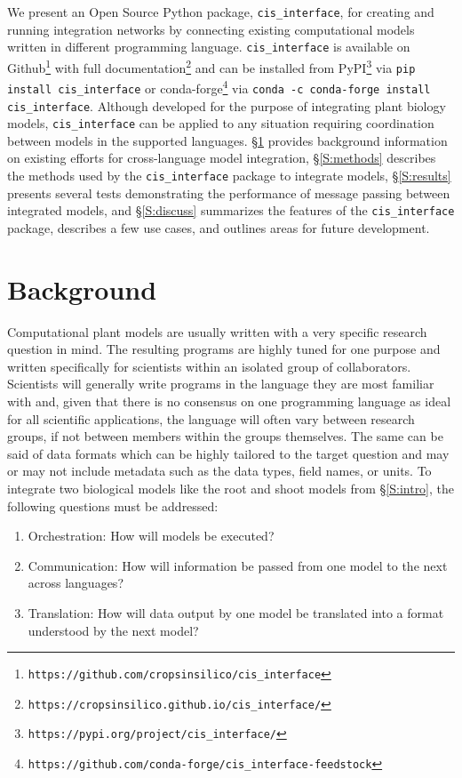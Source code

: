 \documentclass[journal]{IEEEtran}
\newcommand{\cis}{{\tt cis\_interface}{}}
\begin{document}
We present an Open Source Python package, {\cis}, for creating and running integration networks by connecting existing computational models written in different programming language. {\cis} is available on Github\footnote{{\tt https://github.com/cropsinsilico/cis\_interface}} with full documentation\footnote{{\tt https://cropsinsilico.github.io/cis\_interface/}} and can be installed from PyPI\footnote{{\tt https://pypi.org/project/cis\_interface/}} via {\tt pip install {\cis}} or conda-forge\footnote{{\tt https://github.com/conda-forge/cis\_interface-feedstock}} via {\tt conda -c conda-forge install {\cis}}. Although developed for the purpose of integrating plant biology models, {\cis} can be applied to any situation requiring coordination between models in the supported languages. \S\ref{S:background} provides background information on existing efforts for cross-language model integration, \S\ref{S:methods} describes the methods used by the {\cis} package to integrate models, \S\ref{S:results} presents several tests demonstrating the performance of message passing between integrated models, and \S\ref{S:discuss} summarizes the features of the {\cis} package, describes a few use cases, and outlines areas for future development.

\section{Background}\label{S:background}
%
Computational plant models are usually written with a very specific research question in mind. The resulting programs are highly tuned for one purpose and written specifically for scientists within an isolated group of collaborators. Scientists will generally write programs in the language they are most familiar with and, given that there is no consensus on one programming language as ideal for all scientific applications, the language will often vary between research groups, if not between members within the groups themselves. The same can be said of data formats which can be highly tailored to the target question and may or may not include metadata such as the data types, field names, or units. To integrate two biological models like the root and shoot models from \S\ref{S:intro}, the following questions must be addressed:
%
\begin{enumerate}
	\item Orchestration: How will models be executed?
	\item Communication: How will information be passed from one model to the next across languages?
	\item Translation: How will data output by one model be translated into a format understood by the next model?
\end{enumerate}
\end{document}
